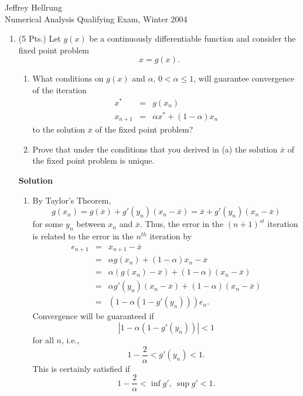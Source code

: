 \documentclass{article}
\begin{document}
\begin{flushright}
Jeffrey Hellrung \\
Numerical Analysis Qualifying Exam, Winter 2004 \\
\end{flushright}


\begin{enumerate}

\item (5 Pts.) Let \(g(x)\) be a continuously differentiable function and consider the fixed point problem
\[x = g(x).\]

\begin{enumerate}
\item What conditions on \(g(x)\) and \(\alpha\), \(0 < \alpha \leq 1\), will guarantee convergence of the iteration
\begin{eqnarray*}
x^* & = & g(x_n) \\
x_{n + 1} & = & \alpha x^* + (1 - \alpha) x_n
\end{eqnarray*}
to the solution \(\overline{x}\) of the fixed point problem?

\item Prove that under the conditions that you derived in (a) the solution \(\overline{x}\) of the fixed point problem is unique.

\end{enumerate}

{\bf Solution}

\begin{enumerate}
\item By Taylor's Theorem,
\[g(x_n) = g(\overline{x}) + g'(y_n)(x_n - \overline{x})
         = \overline{x} + g'(y_n)(x_n - \overline{x})\]
for some \(y_n\) between \(x_n\) and \(\overline{x}\).  Thus, the error in the \((n+1)^{st}\) iteration is related to the error in the \(n^{th}\) iteration by
\begin{eqnarray*}
e_{n + 1} & = & x_{n + 1} - \overline{x} \\
          & = & \alpha g(x_n) + (1 - \alpha) x_n - \overline{x} \\
          & = & \alpha (g(x_n) - \overline{x}) + (1 - \alpha) (x_n - \overline{x}) \\
          & = & \alpha g'(y_n) (x_n - \overline{x}) + (1 - \alpha) (x_n - \overline{x}) \\
          & = & \left( 1 - \alpha(1 - g'(y_n)) \right) e_n.
\end{eqnarray*}
Convergence will be guaranteed if
\[\left| 1 - \alpha(1 - g'(y_n)) \right| < 1\]
for all \(n\), i.e.,
\[1 - \frac{2}{\alpha} < g'(y_n) < 1.\]
This is certainly satisfied if
\[1 - \frac{2}{\alpha} < \inf g', \ \sup g' < 1.\]


\end{enumerate}
\end{enumerate}
\end{document}
